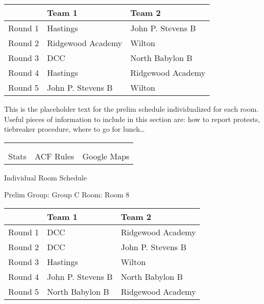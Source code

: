 \documentclass{article}%
\begin{document}
%
\begin{tabularx}{\textwidth}{|c|Y|Y|}%
\hline%
&Team 1&Team 2\\%
\hline%
Round 1&Hastings&John P. Stevens B\\%
Round 2&Ridgewood Academy&Wilton\\%
Round 3&DCC&North Babylon B\\%
Round 4&Hastings&Ridgewood Academy\\%
Round 5&John P. Stevens B&Wilton\\%
\hline%
\end{tabularx}%
\vspace*{16pt}%
\linebreak%
This is the placeholder text for the prelim schedule individualized for each room. Useful pieces of information to include in this section are: how to report protests, tiebreaker procedure, where to go for lunch…%
\vspace*{30pt}%
\newline%
%
\begin{tabularx}{\textwidth}{YYY}%
  &  &  \\%
\\%
Stats&ACF Rules&Google Maps\\%
\end{tabularx}%
\newpage%
\begin{center}%
\begin{Huge}%
Individual Room Schedule%
\end{Huge}%
\vspace*{16pt}%
\linebreak%
\begin{Large}%
Prelim Group: Group C \hfill Room: Room 8%
\end{Large}%
\end{center}%
%
\begin{tabularx}{\textwidth}{|c|Y|Y|}%
\hline%
&Team 1&Team 2\\%
\hline%
Round 1&DCC&Ridgewood Academy\\%
Round 2&DCC&John P. Stevens B\\%
Round 3&Hastings&Wilton\\%
Round 4&John P. Stevens B&North Babylon B\\%
Round 5&North Babylon B&Ridgewood Academy\\%
\hline%
\end{tabularx}%
\end{document}
